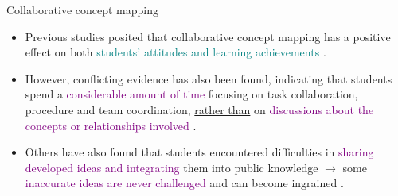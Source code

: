 \begin{frame}{Collaborative concept mapping}  
    \begin{itemize}

        \item<1-2> Previous studies posited that collaborative concept mapping has a positive effect on both \textcolor{teal}{students’ attitudes and learning achievements} \cite{Basque2006CollaborativeTrends,Czerniak1998TheScience}.
        
        \item<2-3> However, conflicting evidence has also been found, indicating that students spend a \textcolor{purple}{considerable amount of time} focusing on task collaboration, procedure and team coordination, \underline{rather than} on \textcolor{purple}{discussions about the concepts or relationships involved \cite{chiu2003exploring}}. 
        
        \item<3> Others have also found that students encountered difficulties in \textcolor{purple}{sharing developed ideas and integrating} them into public knowledge \cite{Gracia-Moreno2017CollaborativeWorkspaces,vanBoxtel2000CollaborativeKnowledge} $\longrightarrow$ some \textcolor{purple}{inaccurate ideas are never challenged} and can become ingrained \cite{roth1992social}.
    \end{itemize}
\end{frame}

